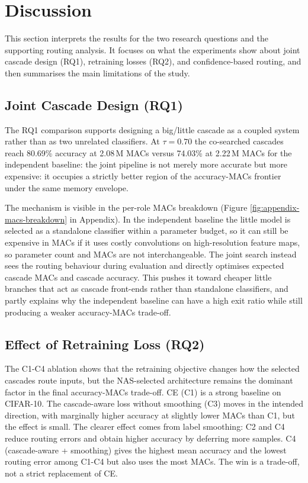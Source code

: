 \documentclass[conference]{IEEEtran}
\begin{document}
\section{Discussion}
\label{sec:discussion}

This section interprets the results for the two research questions and the
supporting routing analysis. It focuses on what the experiments show about
joint cascade design (RQ1), retraining losses (RQ2), and confidence-based
routing, and then summarises the main limitations of the study.

\subsection{Joint Cascade Design (RQ1)}

The RQ1 comparison supports designing a big/little cascade as a coupled
system rather than as two unrelated classifiers. At $\tau=0.70$ the
co-searched cascades reach 80.69\% accuracy at 2.08\,M MACs versus 74.03\%
at 2.22\,M MACs for the independent baseline: the joint pipeline is not
merely more accurate but more expensive: it occupies a strictly better
region of the accuracy-MACs frontier under the same memory envelope.

The mechanism is visible in the per-role MACs breakdown
(Figure \ref{fig:appendix-macs-breakdown} in Appendix). In the independent baseline the
little model is selected as a standalone classifier within a parameter
budget, so it can still be expensive in MACs if it uses costly convolutions
on high-resolution feature maps, so parameter count and MACs are not
interchangeable. The joint search instead sees the routing behaviour
during evaluation and directly optimises expected cascade MACs and cascade
accuracy. This pushes it toward cheaper little branches that act as
cascade front-ends rather than standalone classifiers, and partly explains
why the independent baseline can have a high exit ratio while still
producing a weaker accuracy-MACs trade-off.

\subsection{Effect of Retraining Loss (RQ2)}

The C1-C4 ablation shows that the retraining objective changes how the
selected cascades route inputs, but the NAS-selected architecture remains
the dominant factor in the final accuracy-MACs trade-off. CE (C1) is a
strong baseline on CIFAR-10. The cascade-aware loss without smoothing (C3)
moves in the intended direction, with marginally higher accuracy at
slightly lower MACs than C1, but the effect is small. The clearer effect comes
from label smoothing: C2 and C4 reduce routing errors and obtain higher
accuracy by deferring more samples. C4 (cascade-aware + smoothing) gives
the highest mean accuracy and the lowest routing error among C1-C4 but
also uses the most MACs. The win is a trade-off, not a strict replacement
of CE.
\end{document}

